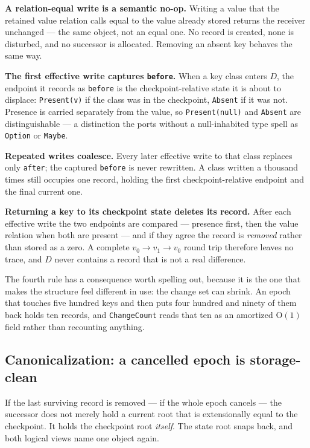 \documentclass[11pt,twoside,openright]{book}
\newcommand{\code}[1]{\texorpdfstring{\textcolor{d7ink}{\texttt{#1}}}{#1}}
\newcommand{\bigoh}[1]{$\mathrm{O}(#1)$}
\begin{document}
\begin{contractbox}
\textbf{A relation-equal write is a semantic no-op.} Writing a value that the
retained value relation calls equal to the value already stored returns the
receiver unchanged --- the same object, not an equal one. No record is created,
none is disturbed, and no successor is allocated. Removing an absent key behaves
the same way.

\textbf{The first effective write captures \code{before}.} When a key class
enters $D$, the endpoint it records as \code{before} is the checkpoint-relative
state it is about to displace: \code{Present(v)} if the class was in the
checkpoint, \code{Absent} if it was not. Presence is carried separately from the
value, so \code{Present(null)} and \code{Absent} are distinguishable --- a
distinction the ports without a null-inhabited type spell as \code{Option} or
\code{Maybe}.

\textbf{Repeated writes coalesce.} Every later effective write to that class
replaces only \code{after}; the captured \code{before} is never rewritten. A
class written a thousand times still occupies one record, holding the first
checkpoint-relative endpoint and the final current one.

\textbf{Returning a key to its checkpoint state deletes its record.} After each
effective write the two endpoints are compared --- presence first, then the
value relation when both are present --- and if they agree the record is
\emph{removed} rather than stored as a zero. A complete
$v_0 \to v_1 \to v_0$ round trip therefore leaves no trace, and $D$ never
contains a record that is not a real difference.
\end{contractbox}

The fourth rule has a consequence worth spelling out, because it is the one that
makes the structure feel different in use: the change set can shrink. An epoch
that touches five hundred keys and then puts four hundred and ninety of them
back holds ten records, and \code{ChangeCount} reads that ten as an amortized
\bigoh{1} field rather than recounting anything.

\subsection{Canonicalization: a cancelled epoch is storage-clean}

If the last surviving record is removed --- if the whole epoch cancels --- the
successor does not merely hold a current root that is extensionally equal to the
checkpoint. It holds the checkpoint root \emph{itself}. The state root snaps
back, and both logical views name one object again.
\end{document}
